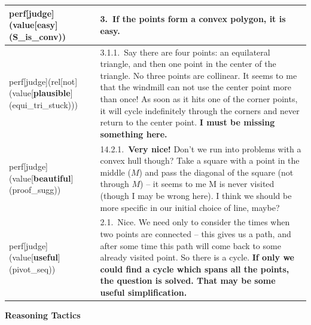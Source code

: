 \documentclass[smallextended,oneside]{svjour3}       %
\newcounter{turn}
\begin{document}
{\noindent
\noindent\begin{tabular}{|p{}|p{}|}
\hline
perf[judge](value[\textbf{easy}](S_is_conv)) & 3.~\textbf{If the points form a convex polygon, it is easy.}\\ \hline
perf[judge](rel[not](value[\textbf{plausible}](equi_tri_stuck))) & 3.1.1.~Say there are four points: an equilateral triangle, and then one point in the center of the triangle. No three points are collinear. It seems to me that the windmill can not use the center point more than once! As soon as it hits one of the corner points, it will cycle indefinitely through the corners and never return to the center point. \textbf{I must be missing something here.}\\ \hline
perf[judge](value[\textbf{beautiful}](proof_sugg)) & 14.2.1.~\textbf{Very nice!} Don't we run into problems with a convex hull though? Take a square with a point in the middle ($M$) and pass the diagonal of the square (not through $M$) -- it seems to me M is never visited (though I may be wrong here). I think we should be more specific in our initial choice of line, maybe?\\ \hline
perf[judge](value[\textbf{useful}](pivot_seq)) & 2.1.~Nice. We need only to consider the times when two points are connected -- this gives us a path, and after some time this path will come back to some already visited point. So there is a cycle.  \textbf{If only we could find a cycle which spans all the points, the question is solved. That may be some useful simplification.}\\ \hline
\end{tabular}

\medskip

{\centering
\textbf{Reasoning Tactics} 

\par}

\smallskip

}
\end{document}
